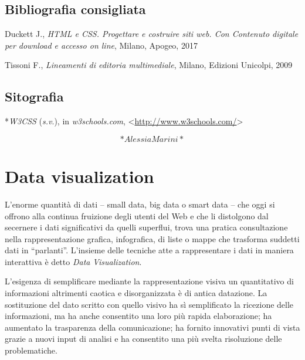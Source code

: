 \documentclass[
  b5paper,
  twoside,
  11pt,
  chapterprefix=false,
  bibliography=totocnumbered,
  parskip=0]{scrbook}
\begin{document}
\hypertarget{bibliografia-consigliata-4}{%
\section*{Bibliografia consigliata}\label{bibliografia-consigliata-4}}

Duckett J., \emph{HTML e CSS. Progettare e costruire siti web. Con Contenuto
digitale per download e accesso on line}, Milano, Apogeo, 2017

Tissoni F., \emph{Lineamenti di editoria multimediale}, Milano, Edizioni
Unicolpi, 2009

\hypertarget{sitografia-6}{%
\section*{Sitografia}\label{sitografia-6}}

*\emph{W3CSS} (\emph{s.v}.), in \emph{w3schools.com},
\textless{}{\url{http://www.w3schools.com/}\textgreater{}}

\[*Alessia Marini*\]

\hypertarget{data-visualization}{%
\chapter{Data visualization}\label{data-visualization}}

L'enorme quantità di dati -- small data, big data o smart data -- che
oggi si offrono alla continua fruizione degli utenti del Web e che li
distolgono dal secernere i dati significativi da quelli superflui, trova
una pratica consultazione nella rappresentazione grafica, infografica,
di liste o mappe che trasforma suddetti dati in \enquote{parlanti}. L'insieme
delle tecniche atte a rappresentare i dati in maniera interattiva è
detto \emph{Data} \emph{Visualization}.

L'esigenza di semplificare mediante la rappresentazione visiva un
quantitativo di informazioni altrimenti caotica e disorganizzata è di
antica datazione. La sostituzione del dato scritto con quello visivo ha
sì semplificato la ricezione delle informazioni, ma ha anche consentito
una loro più rapida elaborazione; ha aumentato la trasparenza della
comunicazione; ha fornito innovativi punti di vista grazie a nuovi input
di analisi e ha consentito una più svelta risoluzione delle
problematiche.
\end{document}
